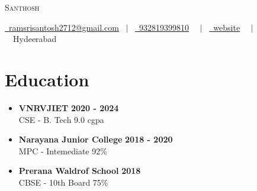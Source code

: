 \documentclass[letterpaper,5pt]{article}
\begin{document}
    

    
    \begin{center}
        {\Huge \scshape Santhosh} \\ \vspace{1pt}
        
        \href{mailto:ramsrisantosh2712@gmail.com}{\raisebox{-0.05\height}\faEnvelope \ ramsrisantosh2712@gmail.com} 
        \ $|$ \ \href{tel:932819399810}{\raisebox{-0.05\height}\faMobile \ 932819399810}  \
        \ $|$ \ \href{website}{\raisebox{-0.05\height}\faGlobe \ website}  \
        \ $|$ \ {\raisebox{-0.05\height}\faMapMarker \ Hydeerabad} \ \  
        \vspace{-8pt}
    \end{center}
    
    
      \section{\textbf{Education}}
      
          \begin{itemize}[leftmargin=0in, label={}]
          \item
            \textbf{VNRVJIET} \hfill \textbf{2020 - 2024} \\
            CSE - B. Tech \hfill 9.0 cgpa
          \end{itemize}
          \vspace{-1mm}
        
          \begin{itemize}[leftmargin=0in, label={}]
          \item
            \textbf{Narayana Junior College} \hfill \textbf{2018 - 2020} \\
            MPC - Intemediate \hfill 92\%
          \end{itemize}
          \vspace{-1mm}
        
          \begin{itemize}[leftmargin=0in, label={}]
          \item
            \textbf{Prerana Waldrof School} \hfill \textbf{2018} \\
            CBSE - 10th Board \hfill 75\%
          \end{itemize}
          \vspace{-1mm}
        
        \vspace{3mm}
    
    
\end{document}
